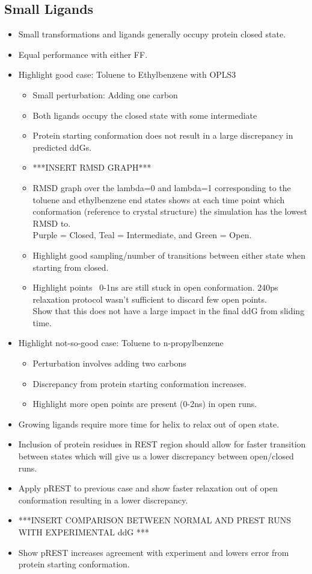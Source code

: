 \documentclass{article}
\begin{document}
\subsection{Small Ligands}
   \begin{itemize}
   \item Small transformations and ligands generally occupy protein closed state.
   \item Equal performance with either FF.
   \item Highlight good case: Toluene to Ethylbenzene with OPLS3
      \begin{itemize}
      \item Small perturbation: Adding one carbon
      \item Both ligands occupy the closed state with some intermediate
      \item Protein starting conformation does not result in a large discrepancy in predicted ddGs.
      \item ***INSERT RMSD GRAPH***
      \item RMSD graph over the lambda=0 and lambda=1 corresponding to the toluene and ethylbenzene end states shows at each time point which conformation (reference to crystal structure) the simulation has the lowest RMSD to.
         \\ Purple = Closed, Teal = Intermediate, and Green = Open.
      \item Highlight good sampling/number of transitions between either state when starting from closed.
      \item Highlight points ~0-1ns are still stuck in open conformation. 240ps relaxation protocol wasn't sufficient to discard few open points.
         \\ Show that this does not have a large impact in the final ddG from sliding time.
      \end{itemize}
   
   \item Highlight not-so-good case: Toluene to n-propylbenzene
      \begin{itemize}
      \item Perturbation involves adding two carbons
      \item Discrepancy from protein starting conformation increases.
      \item Highlight more open points are present (0-2ns) in open runs.
      \end{itemize}
   \item Growing ligands require more time for helix to relax out of open state.
   \item Inclusion of protein residues in REST region should allow for faster transition between states which will give us a lower discrepancy between open/closed runs.
   \item Apply pREST to previous case and show faster relaxation out of open conformation resulting in a lower discrepancy.
   \item ***INSERT COMPARISON BETWEEN NORMAL AND PREST RUNS WITH EXPERIMENTAL ddG ***
   \item Show pREST increases agreement with experiment and lowers error from protein starting conformation.
   \end{itemize}
\end{document}
